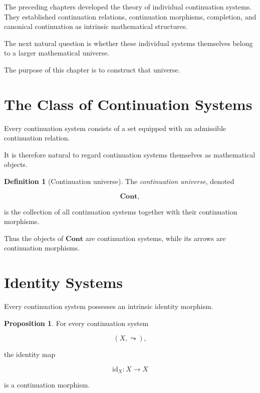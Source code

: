 \documentclass[13pt,openany]{book}
\theoremstyle{plain}
\theoremstyle{definition}
\newtheorem{definition}{Definition}[chapter]
\newtheorem{proposition}{Proposition}[chapter]
\begin{document}
The preceding chapters developed the theory of individual continuation systems.
They established continuation relations, continuation morphisms, completion,
and canonical continuation as intrinsic mathematical structures.

The next natural question is whether these individual systems themselves belong
to a larger mathematical universe.

The purpose of this chapter is to construct that universe.


\section{The Class of Continuation Systems}

Every continuation system consists of a set equipped with an admissible
continuation relation.

It is therefore natural to regard continuation systems themselves as
mathematical objects.

\begin{definition}[Continuation universe]
The \emph{continuation universe}, denoted

\[
\mathbf{Cont},
\]

is the collection of all continuation systems together with their continuation
morphisms.
\end{definition}

Thus the objects of $\mathbf{Cont}$ are continuation systems, while its arrows
are continuation morphisms.


\section{Identity Systems}

Every continuation system possesses an intrinsic identity morphism.

\begin{proposition}
For every continuation system

\[
(X,\leadsto),
\]

the identity map

\[
\mathrm{id}_X:X\to X
\]

is a continuation morphism.
\end{proposition}
\end{document}
